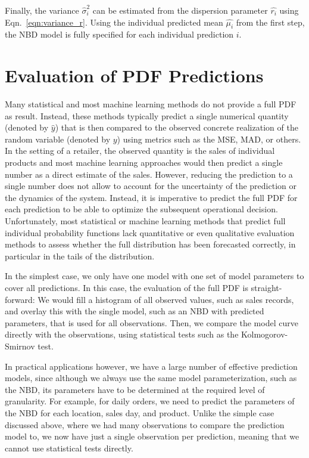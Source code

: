 \documentclass[BCOR=1mm, DIV=calc,10pt,
twoside=true,
twocolumn,
headings=normal]{scrartcl}
\newcommand{\eqn}{Eqn.~}
\begin{document}
Finally, the variance $\hat{\sigma}^2_i$ can be estimated from the dispersion parameter $\hat{r_i}$ using \eqn \eqref{eqn:variance_r}. Using  the individual predicted mean $\hat{\mu_i}$ from the first step, the NBD model is fully specified for each individual prediction $i$.


\section{Evaluation of PDF Predictions}
\label{sec:pdfEvaluation}

Many statistical and most machine learning methods do not provide a full PDF as result. Instead, these methods typically predict a single numerical quantity (denoted by $\hat{y}$) that is then compared to the observed concrete realization of the random variable (denoted by $y$) using metrics such as the MSE, MAD, or others. In the setting of a retailer, the observed quantity is the sales of individual products and most machine learning approaches would then predict a single number as a direct estimate of the sales. However, reducing the prediction to a single number does not allow to account for the uncertainty of the prediction or the dynamics of the system. Instead, it is imperative to predict the full PDF for each prediction to be able to optimize the subsequent operational decision. Unfortunately, most statistical or machine learning methods that predict full individual probability functions lack quantitative or even qualitative evaluation methods to assess whether the full distribution has been forecasted correctly, in particular in the tails of the distribution.

In the simplest case, we only have one model with one set of model parameters to cover all predictions. In this case, the evaluation of the full PDF is straight-forward: We would fill a histogram of all observed values, such as sales records, and overlay this with the single model, such as an NBD with predicted parameters, that is used for all observations. Then, we compare the model curve directly with the observations, using statistical tests such as the Kolmogorov-Smirnov test.

In practical applications however, we have a large number of effective prediction models, since although we always use the same model parameterization, such as the NBD, its parameters have to be determined at the required level of granularity. For example, for daily orders, we need to predict the parameters of the NBD for each location, sales day, and product. Unlike the simple case discussed above, where we had many observations to compare the prediction model to, we now have just a single observation per prediction, meaning that we cannot use statistical tests directly.
\end{document}
